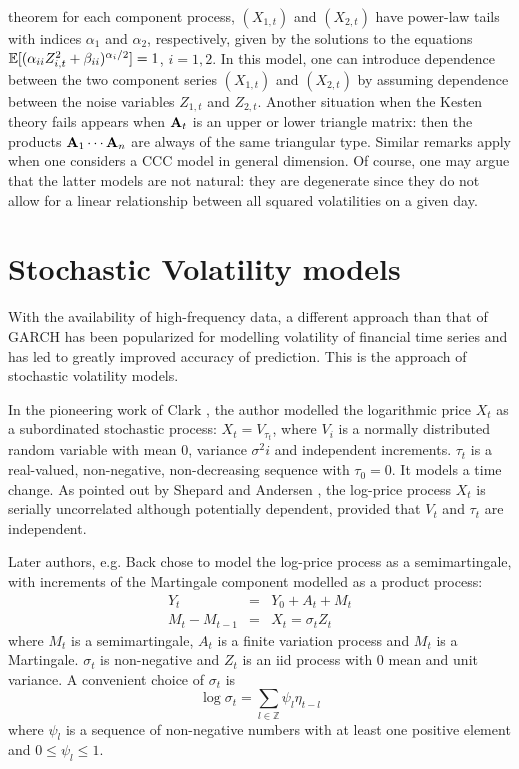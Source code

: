 theorem for each component process, $(X_{1,t})$ and $(X_{2,t})$ have
power-law tails  with indices $\alpha_1$ and $\alpha_2$, respectively,
given by the solutions to the equations  $\mathbb{E} [(\alpha_{ii}
Z_{i,t}^2+\beta_{ii})^{\alpha_i/2}]=1$, $i=1,2$. In this model, one
can introduce dependence between the two component series $(X_{1,t})$
and $(X_{2,t})$ by assuming dependence between the noise variables
$Z_{1,t}$ and $Z_{2,t}$. Another situation when the Kesten theory fails 
appears when ${\mathbf A}_t$ is an upper or lower triangle matrix: then the
products  ${\mathbf A}_1\cdots{\mathbf A}_n$ are always of the same triangular
type. 
Similar remarks apply when one considers a CCC model in general
dimension. Of course, one may argue that the latter models 
are not natural: they are degenerate since they do not allow 
for a linear relationship between all squared volatilities on a given
day.

\section{Stochastic Volatility models}
With the availability of high-frequency data, a different approach
than that of GARCH has been popularized for modelling volatility of
financial time series and has led to greatly improved accuracy of
prediction. This is the approach of stochastic volatility models.

In the pioneering work of Clark \cite{clark:1973}, the author modelled
the logarithmic price $X_t$ as a subordinated stochastic process:
$X_t = V_{\tau_t}$, where $V_i$ is a normally distributed random
variable with mean 0, variance $\sigma^2 i$ and independent
increments. $\tau_t$ is a real-valued, non-negative, non-decreasing
sequence with $\tau_0 = 0$. It models a time change. As pointed out by
Shepard and Andersen \cite{Shephard:Andersen:2009}, the log-price
process $X_t$ is serially uncorrelated although potentially dependent,
provided that $V_t$ and $\tau_t$ are independent.

Later authors, e.g. Back \cite{back:1991} chose to model the log-price
process as a semimartingale, with increments of the Martingale
component modelled as a product process:
\begin{eqnarray*}
  Y_t &=& Y_0 + A_t + M_t \\
  M_t - M_{t-1} &=& X_t = \sigma_t Z_t
\end{eqnarray*}
where $M_t$ is a semimartingale, $A_t$ is a finite variation process
and $M_t$ is a Martingale. $\sigma_t$ is non-negative and $Z_t$ is an
iid process with 0 mean and unit variance. A convenient choice of
$\sigma_t$ is
\[
\log\sigma_t = \sum_{l \in \mathbb Z} \psi_l \eta_{t-l}
\]
where $\psi_l$ is a sequence of non-negative numbers with at least one
positive element and $0 \leq \psi_l \leq 1$.

